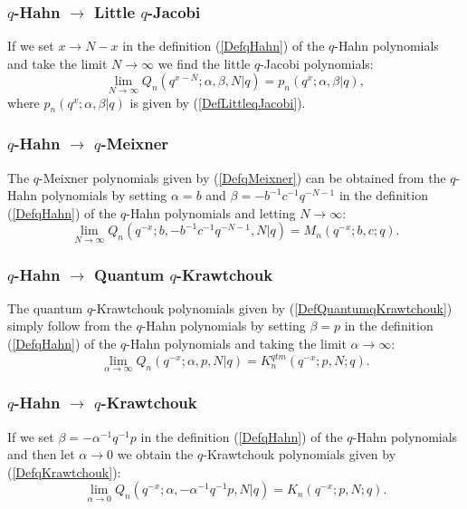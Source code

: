 \documentclass[envcountchap,graybox]{svmono}
\newcounter{rom}
\begin{document}
\subsubsection*{$q$-Hahn $\rightarrow$ Little $q$-Jacobi}
If we set $x\rightarrow N-x$ in the definition (\ref{DefqHahn}) of the $q$-Hahn
polynomials and take the limit $N\rightarrow\infty$ we find the little $q$-Jacobi polynomials:
\begin{equation}
\lim _{N\rightarrow\infty} Q_n(q^{x-N};\alpha,\beta,N|q)=p_n(q^x;\alpha,\beta|q),
\end{equation}
where $p_n(q^x;\alpha,\beta|q)$ is given by (\ref{DefLittleqJacobi}).

\subsubsection*{$q$-Hahn $\rightarrow$ $q$-Meixner}
The $q$-Meixner polynomials given by (\ref{DefqMeixner}) can be obtained from the $q$-Hahn polynomials
by setting $\alpha=b$ and $\beta=-b^{-1}c^{-1}q^{-N-1}$ in the definition (\ref{DefqHahn}) of the
$q$-Hahn polynomials and letting $N\rightarrow\infty$:
\begin{equation}
\lim_{N\rightarrow\infty}
Q_n(q^{-x};b,-b^{-1}c^{-1}q^{-N-1},N|q)=M_n(q^{-x};b,c;q).
\end{equation}

\subsubsection*{$q$-Hahn $\rightarrow$ Quantum $q$-Krawtchouk}
The quantum $q$-Krawtchouk polynomials given by (\ref{DefQuantumqKrawtchouk})
simply follow from the $q$-Hahn polynomials by setting $\beta=p$ in the definition (\ref{DefqHahn}) of
the $q$-Hahn polynomials and taking the limit $\alpha\rightarrow\infty$:
\begin{equation}
\lim_{\alpha\rightarrow\infty}Q_n(q^{-x};\alpha,p,N|q)=K_n^{qtm}(q^{-x};p,N;q).
\end{equation}

\subsubsection*{$q$-Hahn $\rightarrow$ $q$-Krawtchouk}
If we set $\beta=-\alpha^{-1}q^{-1}p$ in the definition (\ref{DefqHahn}) of the $q$-Hahn polynomials
and then let $\alpha\rightarrow 0$ we obtain the $q$-Krawtchouk polynomials given by
(\ref{DefqKrawtchouk}):
\begin{equation}
\lim_{\alpha\rightarrow 0}
Q_n(q^{-x};\alpha,-\alpha^{-1}q^{-1}p,N|q)=K_n(q^{-x};p,N;q).
\end{equation}
\end{document}
